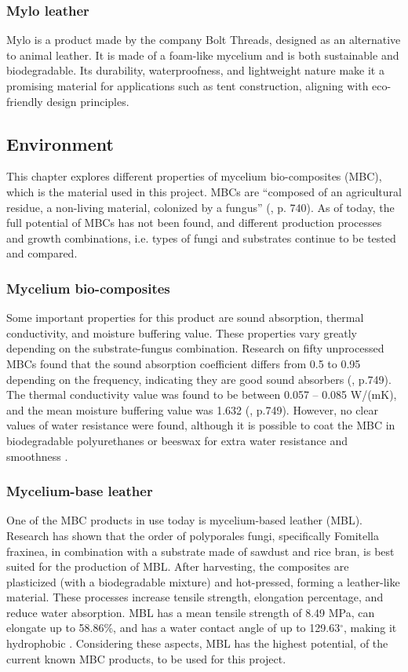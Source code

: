 \documentclass{article}
\begin{document}
\subsubsection{Mylo leather}
Mylo is a product made by the company Bolt Threads, designed as an alternative to animal
leather. It is made of a foam-like mycelium \parencite{myloleather} and
is both sustainable and biodegradable. Its durability, waterproofness, and lightweight
nature make it a promising material for applications such as tent construction, aligning
with eco-friendly design principles.

\subsection{Environment}
This chapter explores different properties of mycelium bio-composites (MBC), which is the
material used in this project. MBCs are ``composed of an agricultural residue, a non-living
material, colonized by a fungus'' (\cite{amziane2023bio}, p. 740). As of today, the full
potential of MBCs has not been found, and different production processes and growth
combinations, i.e. types of fungi and substrates continue to be tested and compared.

\subsubsection{Mycelium bio-composites}
Some important properties for this product are sound absorption, thermal conductivity, and
moisture buffering value. These properties vary greatly depending on the substrate-fungus
combination. Research on fifty unprocessed MBCs found that the sound absorption coefficient
differs from 0.5 to 0.95 depending on the frequency, indicating they are good sound
absorbers (\cite{amziane2023bio}, p.749). The thermal conductivity value was found to be
between 0.057 -- 0.085 W/(mK), and the mean moisture buffering value was 1.632
(\cite{amziane2023bio}, p.749). However, no clear values of water resistance were found,
although it is possible to coat the MBC in biodegradable polyurethanes or beeswax for
extra water resistance and smoothness \parencite{amziane2023bio}.

\subsubsection{Mycelium-base leather}
One of the MBC products in use today is mycelium-based leather (MBL). Research has shown
that the order of polyporales fungi, specifically Fomitella fraxinea, in combination with
a substrate made of sawdust and rice bran, is best suited for the production of MBL. After
harvesting, the composites are plasticized (with a biodegradable mixture) and hot-pressed,
forming a leather-like material. These processes increase tensile strength, elongation
percentage, and reduce water absorption. MBL has a mean tensile strength of 8.49 MPa, can
elongate up to 58.86\%, and has a water contact angle of up to 129.63$^\circ$, making it
hydrophobic \parencite{jof8030317}. Considering these aspects, MBL has the highest
potential, of the current known MBC products, to be used for this project. 
\end{document}
